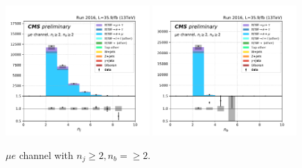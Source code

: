 \begin{figure}[ht]
    \includegraphics[width=0.49\textwidth]{chapters/Appendix/sectionPlots/figures/kinematics_pickles/emu/2b/emu_2b_nJets.pdf}
    \includegraphics[width=0.49\textwidth]{chapters/Appendix/sectionPlots/figures/kinematics_pickles/emu/2b/emu_2b_nBJets.pdf}
    
    \caption{$\mu e$ channel with $n_j\geq2, n_b=\geq2$.}
\end{figure}


